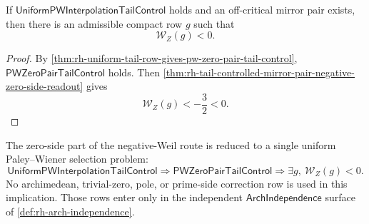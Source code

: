 \begin{corollary}
\label{cor:rh-uniform-tail-row-negative-zero-side-weil-readout}
If $\mathsf{UniformPWInterpolationTailControl}$ holds and an
off-critical mirror pair exists, then there is an admissible compact row
$g$ such that
$$
\mathcal W_Z(g)<0.
$$
\end{corollary}

\begin{proof}
By \autoref{thm:rh-uniform-tail-row-gives-pw-zero-pair-tail-control},
$\mathsf{PWZeroPairTailControl}$ holds.  Then
\autoref{thm:rh-tail-controlled-mirror-pair-negative-zero-side-readout}
gives
$$
\mathcal W_Z(g)<-\frac32<0.
$$
\end{proof}

\begin{principle}
\label{prin:rh-zero-side-boundary-negative-weil-route}
The zero-side part of the negative-Weil route is reduced to a single
uniform Paley--Wiener selection problem:
$$
\mathsf{UniformPWInterpolationTailControl}
\Longrightarrow
\mathsf{PWZeroPairTailControl}
\Longrightarrow
\exists g,\ \mathcal W_Z(g)<0.
$$
No archimedean, trivial-zero, pole, or prime-side correction row is used
in this implication.  Those rows enter only in the independent
$\mathsf{ArchIndependence}$ surface of
\autoref{def:rh-arch-independence}.
\end{principle}
